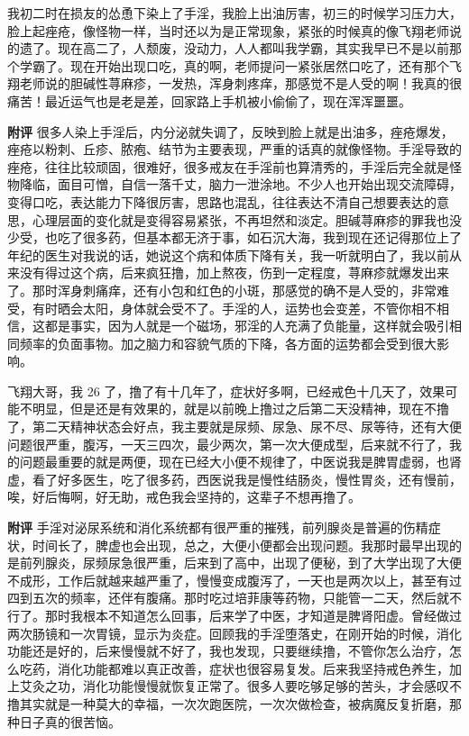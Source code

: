 \begin{case}
    我初二时在损友的怂恿下染上了手淫，我脸上出油厉害，初三的时候学习压力大，脸上起痤疮，像怪物一样，当时还以为是正常现象，紧张的时候真的像飞翔老师说的遗了。现在高二了，人颓废，没动力，人人都叫我学霸，其实我早已不是以前那个学霸了。现在开始出现口吃，真的啊，老师提问一紧张居然口吃了，还有那个飞翔老师说的胆碱性荨麻疹，一发热，浑身刺疼痒，那感觉不是人受的啊！我真的很痛苦！最近运气也是老是差，回家路上手机被小偷偷了，现在浑浑噩噩。

    \textbf{附评} 很多人染上手淫后，内分泌就失调了，反映到脸上就是出油多，痤疮爆发，痤疮以粉刺、丘疹、脓疱、结节为主要表现，严重的话真的就像怪物。手淫导致的痤疮，往往比较顽固，很难好，很多戒友在手淫前也算清秀的，手淫后完全就是怪物降临，面目可憎，自信一落千丈，脑力一泄涂地。不少人也开始出现交流障碍，变得口吃，表达能力下降很厉害，思路也混乱，往往表达不清自己想要表达的意思，心理层面的变化就是变得容易紧张，不再坦然和淡定。胆碱荨麻疹的罪我也没少受，也吃了很多药，但基本都无济于事，如石沉大海，我到现在还记得那位上了年纪的医生对我说的话，她说这个病和体质下降有关，我一听就明白了，我以前从来没有得过这个病，后来疯狂撸，加上熬夜，伤到一定程度，荨麻疹就爆发出来了。那时浑身刺痛痒，还有小包和红色的小斑，那感觉的确不是人受的，非常难受，有时晒会太阳，身体就会受不了。手淫的人，运势也会变差，不管你相不相信，这都是事实，因为人就是一个磁场，邪淫的人充满了负能量，这样就会吸引相同频率的负面事物。加之脑力和容貌气质的下降，各方面的运势都会受到很大影响。
\end{case}

\begin{case}
    飞翔大哥，我 26 了，撸了有十几年了，症状好多啊，已经戒色十几天了，效果可能不明显，但是还是有效果的，就是以前晚上撸过之后第二天没精神，现在不撸了，第二天精神状态会好点，我主要就是尿频、尿急、尿不尽、尿等待，还有大便问题很严重，腹泻，一天三四次，最少两次，第一次大便成型，后来就不行了，我的问题最重要的就是两便，现在已经大小便不规律了，中医说我是脾胃虚弱，也肾虚，看了好多医生，吃了很多药，西医说我是慢性结肠炎，慢性胃炎，还有慢前，唉，好后悔啊，好无助，戒色我会坚持的，这辈子不想再撸了。

    \textbf{附评} 手淫对泌尿系统和消化系统都有很严重的摧残，前列腺炎是普遍的伤精症状，时间长了，脾虚也会出现，总之，大便小便都会出现问题。我那时最早出现的是前列腺炎，尿频尿急很严重，后来到了高中，出现了便秘，到了大学出现了大便不成形，工作后就越来越严重了，慢慢变成腹泻了，一天也是两次以上，甚至有过四到五次的频率，还伴有腹痛。那时吃过培菲康等药物，只能管一二天，然后就不行了。那时我根本不知道怎么回事，后来学了中医，才知道是脾肾阳虚。曾经做过两次肠镜和一次胃镜，显示为炎症。回顾我的手淫堕落史，在刚开始的时候，消化功能还是好的，后来慢慢就不好了，我也发现，只要继续撸，不管你怎么治疗，怎么吃药，消化功能都难以真正改善，症状也很容易复发。后来我坚持戒色养生，加上艾灸之功，消化功能慢慢就恢复正常了。很多人要吃够足够的苦头，才会感叹不撸其实就是一种莫大的幸福，一次次跑医院，一次次做检查，被病魔反复折磨，那种日子真的很苦恼。
\end{case}


